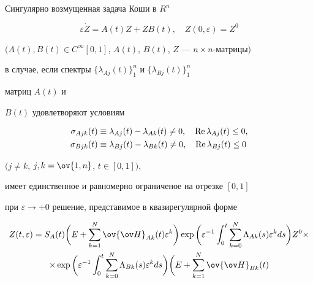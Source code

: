 \begin{thm} 


Сингулярно возмущенная задача Коши в $R^n$ 


\begin{equation} 


\varepsilon\Dot Z=A(t)Z+ZB(t),\quad Z(0,\varepsilon)=Z^0 


\end{equation} 


$(A(t),B(t)\in C^\infty[0,1]$, $A(t)$, $B(t)$, $Z$ --- $n\times 


n$-матрицы$)$ 


в случае, если спектры $\{\lambda_{Aj}(t)\}^n_1$ и $\{\lambda_{Bj}(t)\}^n_1$ 


матриц $A(t)$ и 


$B(t)$ удовлетворяют условиям 


\begin{equation} 


\begin{split} 


\sigma_{Ajk}(t)&\equiv \lambda_{Aj}(t)-\lambda_{Ak}(t)\ne0,\quad 


\re\lambda_{Aj}(t)\le0,\\ 


\sigma_{Bjk}(t)&\equiv \lambda_{Bj}(t)-\lambda_{Bk}(t)\ne0,\quad 


\re\lambda_{Bj}(t)\le0 


\end{split} 


\end{equation} 


$(j\ne k$, $j,k=\ov{1,n}$, $t\in[0,1])$, 


имеет единственное и равномерно ограниченое на отрезке $[0,1]$ 


при $\varepsilon\to+0$ решение, представимое в квазирегулярной форме 


\begin{multline} 


Z(t,\varepsilon)=S_A(t)\bigg(E+\sum^N_{k=1} \ov{\ov H}_{Ak}(t) 


\varepsilon^k\bigg)\exp\bigg(\varepsilon^{-1}\int^t_0\sum^N_{k=0} 


\Lambda_{Ak}(s)\varepsilon^k ds\bigg)Z^0\times \\ 


% 


\times\exp\bigg(\varepsilon^{-1}\int^t_0\sum^N_{k=0} \Lambda_{Bk}(s) 


\varepsilon^k ds\bigg)\bigg(E+\sum^N_{k=1}\ov{\ov H}_{Bk}(t) 



\end{multline}
\end{thm}

